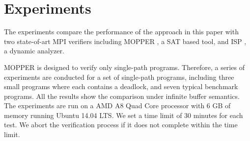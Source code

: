 \section{Experiments}
The experiments compare the performance of the approach in this paper with two state-of-art MPI verifiers including MOPPER \cite{DBLP:conf/fm/ForejtKNS14}, a SAT based tool, and ISP \cite{DBLP:conf/ppopp/VakkalankaSGK08,DBLP:conf/sbmf/SharmaGB12}, a dynamic analyzer. 

MOPPER is designed to verify only single-path programs. 
Therefore, a series of experiments are conducted for a set of single-path programs, including three small programs where each contains a deadlock, and seven typical benchmark programs. All the results show the comparison under infinite buffer semantics.  
The experiments are run on a AMD A8 Quad Core processor with 6 GB of memory running Ubuntu 14.04 LTS. We set a time limit of 30 minutes for each test. We abort the verification process if it does not complete within the time limit. 


